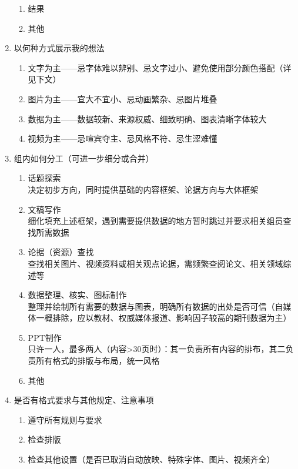 \begin{enumerate}
\begin{enumerate}
              \item 结果
              \item 其他
          \end{enumerate}
    \item 以何种方式展示我的想法
          \begin{enumerate}
              \item 文字为主——忌字体难以辨别、忌文字过小、避免使用部分颜色搭配（详见下文）
              \item 图片为主——宜大不宜小、忌动画繁杂、忌图片堆叠
              \item 数据为主——数据较新、来源权威、细致明确、图表清晰字体较大
              \item 视频为主——忌喧宾夺主、忌风格不符、忌生涩难懂
          \end{enumerate}
          \pagebreak[3]
    \item 组内如何分工（可进一步细分或合并）
          \begin{enumerate}
              \item 话题探索\\
                    决定初步方向，同时提供基础的内容框架、论据方向与大体框架
              \item 文稿写作\\
                    细化填充上述框架，遇到需要提供数据的地方暂时跳过并要求相关组员查找所需数据
              \item 论据（资源）查找\\
                    查找相关图片、视频资料或相关观点论据，需频繁查阅论文、相关领域综述等
              \item 数据整理、核实、图标制作\\
                    整理并绘制所有需要的数据与图表，明确所有数据的出处是否可信（自媒体一概排除，应以教材、权威媒体报道、影响因子较高的期刊数据为主）
              \item PPT制作\\
                    只许一人，最多两人（内容>30页时）：其一负责所有内容的排布，其二负责所有格式的排版与布局，统一风格
              \item 其他
          \end{enumerate}
    \item 是否有格式要求与其他规定、注意事项
          \begin{enumerate}
              \item 遵守所有规则与要求
              \item 检查排版
              \item 检查其他设置（是否已取消自动放映、特殊字体、图片、视频齐全）
          \end{enumerate}
\end{enumerate}

